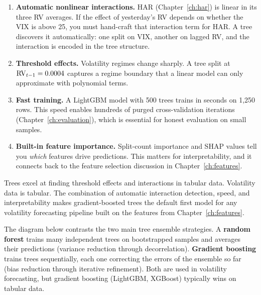 \begin{enumerate}[leftmargin=1.8em]
\item \textbf{Automatic nonlinear interactions.}
  HAR (Chapter~\ref{ch:har}) is linear in its three RV averages.  If the
  effect of yesterday's RV depends on whether the VIX is above 25, you must
  hand-craft that interaction term for HAR.  A tree discovers it
  automatically: one split on VIX, another on lagged RV, and the interaction
  is encoded in the tree structure.

\item \textbf{Threshold effects.}
  Volatility regimes change sharply.  A tree split at
  $\operatorname{RV}_{t-1} = 0.0004$ captures a regime boundary that a linear model can
  only approximate with polynomial terms.

\item \textbf{Fast training.}
  A LightGBM model with 500 trees trains in seconds on 1,250 rows.
  This speed enables hundreds of purged cross-validation iterations
  (Chapter~\ref{ch:evaluation}), which is essential for honest evaluation on
  small samples.

\item \textbf{Built-in feature importance.}
  Split-count importance and SHAP values tell you \emph{which} features
  drive predictions.  This matters for interpretability, and it connects back
  to the feature selection discussion in Chapter~\ref{ch:features}.
\end{enumerate}

\begin{keyidea}
Trees excel at finding threshold effects and interactions in tabular data.
Volatility data is tabular.  The combination of automatic interaction
detection, speed, and interpretability makes gradient-boosted trees the
default first model for any volatility forecasting pipeline built on the
features from Chapter~\ref{ch:features}.
\end{keyidea}

The diagram below contrasts the two main tree ensemble strategies.  A
\textbf{random forest} trains many independent trees on bootstrapped samples
and averages their predictions (variance reduction through decorrelation).
\textbf{Gradient boosting} trains trees sequentially, each one correcting the
errors of the ensemble so far (bias reduction through iterative refinement).
Both are used in volatility forecasting, but gradient boosting (LightGBM,
XGBoost) typically wins on tabular data.

